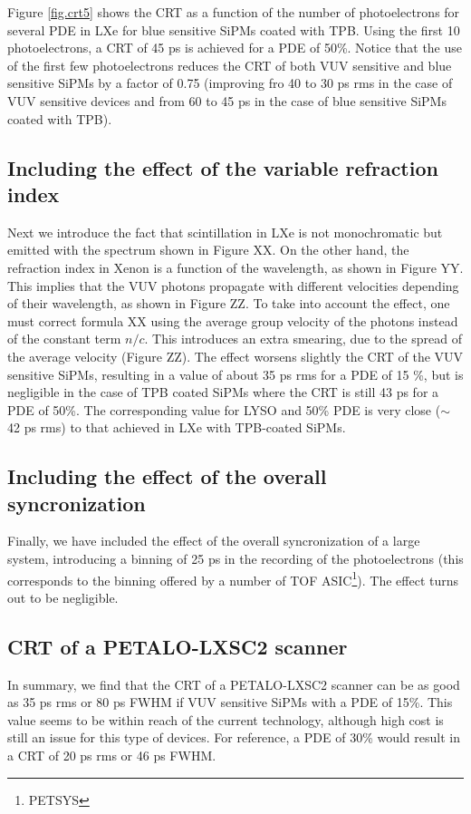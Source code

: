 \documentclass[review]{elsarticle}
\begin{document}
{Figure \ref{fig.crt5} shows the CRT as a function of the number of photoelectrons for several PDE in LXe for blue sensitive SiPMs coated with TPB. Using the first 10 photoelectrons, a CRT of 45 ps is achieved for a  PDE of 50\%. Notice that the use of the first few photoelectrons reduces the CRT of both VUV sensitive and blue sensitive SiPMs 
by a factor of 0.75 (improving fro 40 to 30 ps rms in the case of VUV sensitive devices and from 60 to 45 ps in the case of blue sensitive SiPMs coated with TPB).    

\subsection*{Including the effect of the variable refraction index}
  Next we introduce the fact that scintillation in LXe is not monochromatic but emitted with the spectrum shown in Figure XX. On the other hand, the refraction index in Xenon is a function of the wavelength, as shown in Figure YY. This implies that the VUV photons propagate with different velocities depending of their wavelength, as shown in Figure ZZ. To take into account the effect, one must correct formula XX using the average group velocity of the photons instead of the constant term $n/c$. This introduces an extra smearing, due to the spread of the average velocity (Figure ZZ). The effect worsens slightly the CRT of the VUV sensitive SiPMs, resulting in a value of about 35 ps rms for a PDE of 15 \%, but is negligible in the case of TPB coated SiPMs where the CRT is still 43 ps for a PDE of 50\%. The corresponding value for LYSO and 50\% PDE is very close ($\sim$ 42 ps rms) to that achieved in LXe with TPB-coated SiPMs. 
  
  \subsection*{Including the effect of the overall syncronization}
  Finally, we have included the effect of the overall syncronization of a large system, introducing a binning of 25 ps in the recording of the photoelectrons (this corresponds to the binning offered by a number of TOF ASIC\footnote{PETSYS}). The effect turns out to be negligible.  
  
\subsection*{CRT of a PETALO-LXSC2 scanner}
In summary, we find that the CRT of a PETALO-LXSC2 scanner can be as good as 35 ps rms or 80 ps FWHM if VUV sensitive SiPMs with a PDE of 15\%. This value seems to be within reach of the current technology, although high cost is still an issue for this type of devices. For reference, a PDE of 30\% would result in a CRT of 20 ps rms or 46 ps FWHM. 

}
\end{document}
